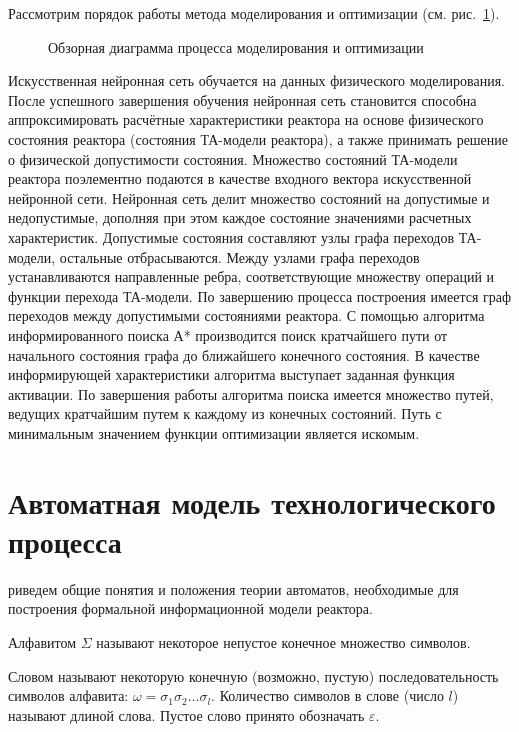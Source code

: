 Рассмотрим порядок работы метода моделирования и оптимизации (см. рис.~\ref{pic:overall}).
\begin{figure}[ht]
  \caption[Обзорная диаграмма процесса моделирования и оптимизации]{Обзорная диаграмма процесса моделирования и оптимизации}
  \label{pic:overall}
  \end{figure}
Искусственная нейронная сеть обучается на данных физического моделирования. После успешного завершения обучения нейронная сеть становится способна аппроксимировать расчётные характеристики реактора на основе физического состояния реактора (состояния ТА-модели реактора), а также принимать решение о физической допустимости состояния.
Множество состояний ТА-модели реактора поэлементно подаются в качестве входного вектора искусственной нейронной сети. Нейронная сеть делит множество состояний на допустимые и недопустимые, дополняя при этом каждое состояние значениями расчетных характеристик. Допустимые состояния составляют узлы графа переходов ТА-модели, остальные отбрасываются.
Между узлами графа переходов устанавливаются направленные ребра, соответствующие множеству операций и функции перехода ТА-модели. По завершению процесса построения имеется граф переходов между допустимыми состояниями реактора.
С помощью алгоритма информированного поиска А* производится поиск кратчайшего пути от начального состояния графа до ближайшего конечного состояния. В качестве информирующей характеристики алгоритма выступает заданная функция активации.
По завершения работы алгоритма поиска имеется множество путей, ведущих кратчайшим путем к каждому из конечных состояний. Путь с минимальным значением функции оптимизации является искомым. \cite{modeling-2014, modeling-2015}



\section{Автоматная модель технологического процесса}

риведем общие понятия и положения теории автоматов, необходимые для построения формальной информационной модели реактора.

\begin{Def}
 Алфавитом $\Sigma$ называют некоторое непустое конечное множество символов.
\end{Def}

\begin{Def}
 Словом называют некоторую конечную (возможно, пустую) последовательность символов алфавита: $\omega = \sigma_1\sigma_2\dots\sigma_l$. 
 Количество символов в слове (число $l$) называют длиной слова. 
 Пустое слово принято обозначать $\varepsilon$.
\end{Def}

